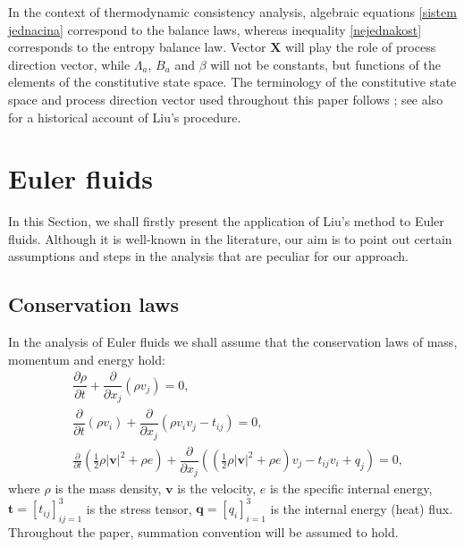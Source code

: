 \documentclass[a4paper,fleqn]{cas-sc}
\theoremstyle{definition}
\begin{document}
In the context of thermodynamic consistency analysis, algebraic equations \eqref{sistem jednacina} correspond to the balance laws, whereas inequality \eqref{nejednakost} corresponds to the entropy balance law. Vector $\mathbf{X}$ will play the role of process direction vector, while $\Lambda_a$, $B_a$ and $\beta$ will not be constants, but functions of the elements of the constitutive state space. The terminology of the constitutive state space and process direction vector used throughout this paper follows \cite{muschik1996amendment}; see also \cite{hauser2002historical} for a historical account of Liu's procedure.


\section{Euler fluids} \label{Sec:EulerFluids}


In this Section, we shall firstly present the application of Liu's method to Euler fluids. Although it is well-known in the literature, our aim is to point out certain assumptions and steps in the analysis that are peculiar for our approach. 

\subsection{Conservation laws}

In the analysis of Euler fluids we shall assume that the conservation laws of mass, momentum and energy hold:
\begin{align}
	\label{zakon održanja mase Ojlerovi fluidi}
	& \dfrac{\partial\rho}{\partial t}+\dfrac{\partial}{\partial x_j}\left(\rho v_j\right)=0,
	\\
	\label{zakon održanja količine kretanja Ojlerovi fluidi}
	& \dfrac{\partial}{\partial t}(\rho v_i)+\dfrac{\partial}{\partial x_j}\left(\rho v_i v_j -t_{ij}\right)=0,
	\\
	\label{zakon održanja energije Ojlerovi fluidi}
	& \frac{\partial}{\partial t}\left(\frac{1}{2}\rho\vert\mathbf{v}\vert ^2+\rho e\right)+\dfrac{\partial}{\partial x_j}\left(\left(\frac{1}{2}\rho\vert\mathbf{v}\vert ^2+\rho e\right)v_j-t_{ij}v_i+q_j\right)=0,
\end{align}
where $\rho$ is the mass density, $\mathbf{v}$ is  the velocity, $e$ is the specific internal energy, $\mathbf{t} = \left[ t_{ij} \right]_{ij=1}^{3}$ is the stress tensor, $\mathbf{q} = \left[ q_{i} \right]_{i=1}^{3}$ is the internal energy (heat) flux. Throughout the paper, summation convention will be assumed to hold. 
\end{document}
